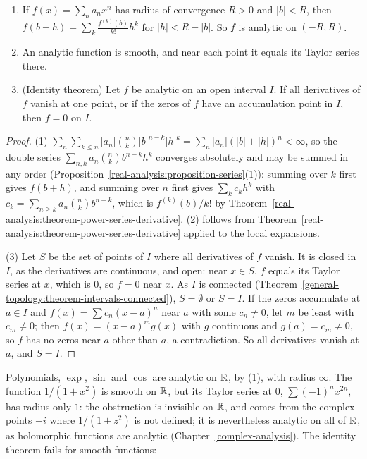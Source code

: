 \begin{proposition}\label{real-analysis:proposition-analytic}
\begin{enumerate}
\item If $f(x) = \sum_na_nx^n$ has radius of convergence $R > 0$ and $|b| < R$, then $f(b + h) = \sum_k\frac{f^{(k)}(b)}{k!}h^k$ for $|h| < R - |b|$. So $f$ is analytic on $(-R, R)$.
\item An analytic function is smooth, and near each point it equals its Taylor series there.
\item (Identity theorem) Let $f$ be analytic on an open interval $I$. If all derivatives of $f$ vanish at one point, or if the zeros of $f$ have an accumulation point in $I$, then $f = 0$ on $I$.
\end{enumerate}
\end{proposition}

\begin{proof}
(1) $\sum_n\sum_{k \leq n}|a_n|\binom nk|b|^{n-k}|h|^k = \sum_n|a_n|(|b| + |h|)^n < \infty$, so the double series $\sum_{n,k}a_n\binom nkb^{n-k}h^k$ converges absolutely and may be summed in any order
(Proposition~\ref{real-analysis:proposition-series}(1)): summing over $k$ first gives $f(b + h)$, and summing over $n$ first gives $\sum_kc_kh^k$ with $c_k = \sum_{n \geq k}a_n\binom nkb^{n-k}$, which is
$f^{(k)}(b)/k!$ by Theorem~\ref{real-analysis:theorem-power-series-derivative}. (2) follows from Theorem~\ref{real-analysis:theorem-power-series-derivative} applied to the local expansions.

(3) Let $S$ be the set of points of $I$ where all derivatives of $f$ vanish. It is closed in $I$, as the derivatives are continuous, and open: near $x \in S$, $f$ equals its Taylor series at $x$, which is
$0$, so $f = 0$ near $x$. As $I$ is connected (Theorem~\ref{general-topology:theorem-intervals-connected}), $S = \emptyset$ or $S = I$. If the zeros accumulate at $a \in I$ and $f(x) = \sum c_n(x - a)^n$
near $a$ with some $c_n \neq 0$, let $m$ be least with $c_m \neq 0$; then $f(x) = (x - a)^mg(x)$ with $g$ continuous and $g(a) = c_m \neq 0$, so $f$ has no zeros near $a$ other than $a$, a contradiction.
So all derivatives vanish at $a$, and $S = I$.
\end{proof}

Polynomials, $\exp$, $\sin$ and $\cos$ are analytic on $\mathbb{R}$, by (1), with radius $\infty$. The function $1/(1 + x^2)$ is smooth on $\mathbb{R}$, but its Taylor series at $0$, $\sum(-1)^nx^{2n}$, has radius only
$1$: the obstruction is invisible on $\mathbb{R}$, and comes from the complex points $\pm i$ where $1/(1 + z^2)$ is not defined; it is nevertheless analytic on all of $\mathbb{R}$, as holomorphic functions are analytic
(Chapter~\ref{complex-analysis}). The identity theorem fails for smooth functions:

